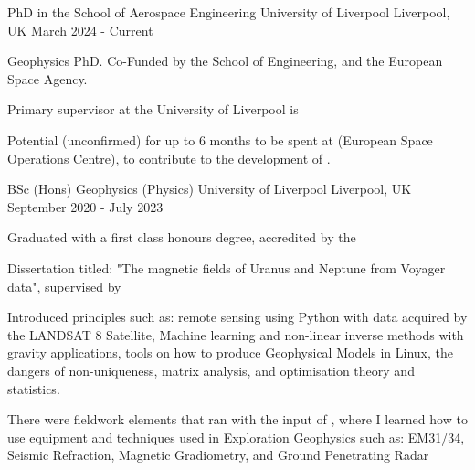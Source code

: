 \begin{cventries}

  \cventry
    {PhD in the School of Aerospace Engineering} %
    {University of Liverpool} %
    {Liverpool, UK} %
    {March 2024 - Current} %
    {
      \begin{cvitems} %
        \item {Geophysics PhD. Co-Funded by the School of Engineering, and the European Space Agency.}
        \item {Primary supervisor at the University of Liverpool is \href{https://www.liverpool.ac.uk/engineering/staff/stefania-soldini/}{\color{darkblue}{Dr Stefania Soldini}} 
        }
        \item {Potential (unconfirmed) for up to 6 months to be spent at \href{https://maps.app.goo.gl/FiTspiLjZnPt5VcE6}{\color{darkblue}{ESOC}} (European Space Operations Centre), to contribute to the development of \href{https://godot.io.esa.int/docs/1.4.0/}{\color{darkblue}{GODOT}}.
        }
      \end{cvitems}
    }
    
  \cventry
    {BSc (Hons) Geophysics (Physics)} %
    {University of Liverpool} %
    {Liverpool, UK} %
    {September 2020 - July 2023} %
    {
      \begin{cvitems} %
        \item {Graduated with a first class honours degree, accredited by the \href{https://www.iop.org/}{\color{darkblue}{Institute of Physics}}}
        \item {Dissertation titled: "The magnetic fields of Uranus and Neptune from Voyager data", supervised by \href{https://www.liverpool.ac.uk/environmental-sciences/staff/richard-holme/}{\color{darkblue}{Professor Richard Holme}}
        }
        \item {Introduced principles such as: remote sensing using Python with data acquired by the LANDSAT 8 Satellite, Machine learning and non-linear inverse methods with gravity applications, tools on how to produce Geophysical Models in Linux, the dangers of non-uniqueness,  matrix analysis, and optimisation theory and statistics. }
        \item {There were fieldwork elements that ran with the input of \href{https://www.sepgeophysical.com/}{\color{darkblue}{SEP Geophysical}}, where I learned how to use equipment and
            techniques used in Exploration Geophysics such as: EM31/34, Seismic Refraction, Magnetic Gradiometry,
            and Ground Penetrating Radar}
      \end{cvitems}
    }
    

\end{cventries}
